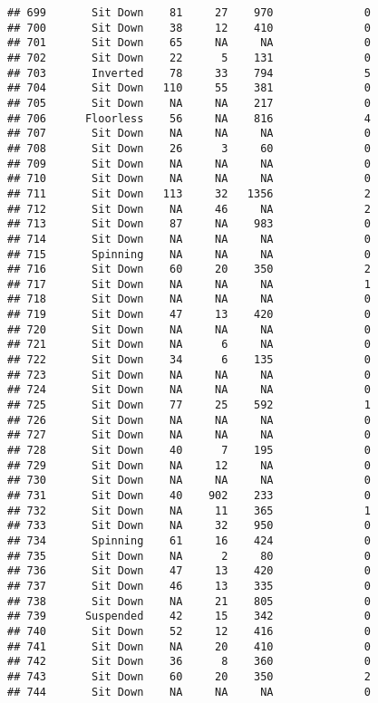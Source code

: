 \documentclass[
]{article}
\begin{document}
\begin{verbatim}
## 699       Sit Down    81     27    970              0
## 700       Sit Down    38     12    410              0
## 701       Sit Down    65     NA     NA              0
## 702       Sit Down    22      5    131              0
## 703       Inverted    78     33    794              5
## 704       Sit Down   110     55    381              0
## 705       Sit Down    NA     NA    217              0
## 706      Floorless    56     NA    816              4
## 707       Sit Down    NA     NA     NA              0
## 708       Sit Down    26      3     60              0
## 709       Sit Down    NA     NA     NA              0
## 710       Sit Down    NA     NA     NA              0
## 711       Sit Down   113     32   1356              2
## 712       Sit Down    NA     46     NA              2
## 713       Sit Down    87     NA    983              0
## 714       Sit Down    NA     NA     NA              0
## 715       Spinning    NA     NA     NA              0
## 716       Sit Down    60     20    350              2
## 717       Sit Down    NA     NA     NA              1
## 718       Sit Down    NA     NA     NA              0
## 719       Sit Down    47     13    420              0
## 720       Sit Down    NA     NA     NA              0
## 721       Sit Down    NA      6     NA              0
## 722       Sit Down    34      6    135              0
## 723       Sit Down    NA     NA     NA              0
## 724       Sit Down    NA     NA     NA              0
## 725       Sit Down    77     25    592              1
## 726       Sit Down    NA     NA     NA              0
## 727       Sit Down    NA     NA     NA              0
## 728       Sit Down    40      7    195              0
## 729       Sit Down    NA     12     NA              0
## 730       Sit Down    NA     NA     NA              0
## 731       Sit Down    40    902    233              0
## 732       Sit Down    NA     11    365              1
## 733       Sit Down    NA     32    950              0
## 734       Spinning    61     16    424              0
## 735       Sit Down    NA      2     80              0
## 736       Sit Down    47     13    420              0
## 737       Sit Down    46     13    335              0
## 738       Sit Down    NA     21    805              0
## 739      Suspended    42     15    342              0
## 740       Sit Down    52     12    416              0
## 741       Sit Down    NA     20    410              0
## 742       Sit Down    36      8    360              0
## 743       Sit Down    60     20    350              2
## 744       Sit Down    NA     NA     NA              0

\end{verbatim}
\end{document}
